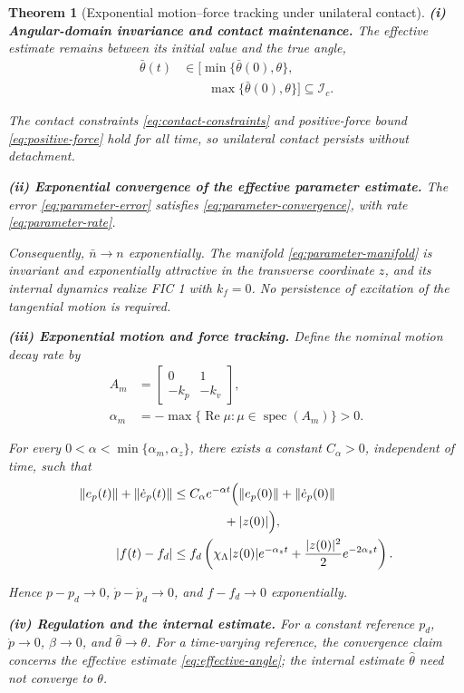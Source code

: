 \documentclass[10pt,journal,letterpaper]{IEEEtran}
\newtheorem{theorem}{Theorem}
\begin{document}
\begin{theorem}[Exponential motion--force tracking under unilateral contact]
\textbf{(i) Angular-domain invariance and contact maintenance.} The effective estimate remains between its initial value and the true angle,
\begin{equation}\label{eq:estimate-interval}
\begin{aligned}
\bar\theta(t)&\in
\bigl[\min\{\bar\theta(0),\theta\},\\
&\qquad\max\{\bar\theta(0),\theta\}\bigr]\subseteq\mathcal I_c.
\end{aligned}
\end{equation}

The contact constraints \eqref{eq:contact-constraints} and positive-force bound \eqref{eq:positive-force} hold for all time, so unilateral contact persists without detachment.

\textbf{(ii) Exponential convergence of the effective parameter estimate.} The error \eqref{eq:parameter-error} satisfies \eqref{eq:parameter-convergence}, with rate \eqref{eq:parameter-rate}.

Consequently, $\bar n\to n$ exponentially. The manifold \eqref{eq:parameter-manifold} is invariant and exponentially attractive in the transverse coordinate $z$, and its internal dynamics realize FIC 1 with $k_f=0$. No persistence of excitation of the tangential motion is required.

\textbf{(iii) Exponential motion and force tracking.} Define the nominal motion decay rate by
\begin{equation}\label{eq:nominal-motion-rate}
\begin{aligned}
A_m&=\begin{bmatrix}0&1\\-k_p&-k_v\end{bmatrix},\\
\alpha_m&=-\max\{\operatorname{Re}\mu:\mu\in\operatorname{spec}(A_m)\}>0.
\end{aligned}
\end{equation}

For every $0<\alpha<\min\{\alpha_m,\alpha_z\}$, there exists a constant $C_\alpha>0$, independent of time, such that
\begin{equation}\label{eq:tracking-bounds}
\begin{aligned}
\|e_p(t)\|+\|\dot e_p(t)\|
&\leq C_\alpha e^{-\alpha t}\Bigl(
\|e_p(0)\|+\|\dot e_p(0)\|\\
&\qquad\qquad+|z(0)|\Bigr),\\
|f(t)-f_d|
&\leq f_d\left(
\chi_\Lambda|z(0)|e^{-\alpha_z t}
+\frac{|z(0)|^2}{2}e^{-2\alpha_z t}
\right).
\end{aligned}
\end{equation}

Hence $p-p_d\to0$, $\dot p-\dot p_d\to0$, and $f-f_d\to0$ exponentially.

\textbf{(iv) Regulation and the internal estimate.} For a constant reference $p_d$, $\dot p\to0$, $\beta\to0$, and $\hat\theta\to\theta$. For a time-varying reference, the convergence claim concerns the effective estimate \eqref{eq:effective-angle}; the internal estimate $\hat\theta$ need not converge to $\theta$.

\end{theorem}
\end{document}
